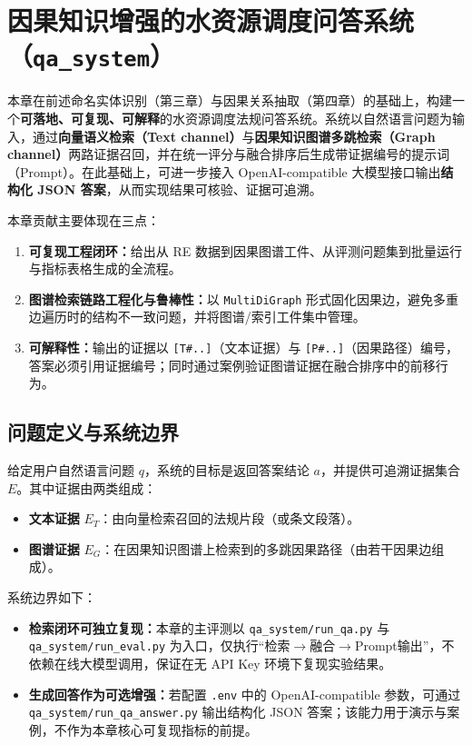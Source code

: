 
\chapter{因果知识增强的水资源调度问答系统（\texttt{qa\_system}）}
\label{chap:qa_system}

本章在前述命名实体识别（第三章）与因果关系抽取（第四章）的基础上，构建一个\textbf{可落地、可复现、可解释}的水资源调度法规问答系统。系统以自然语言问题为输入，通过\textbf{向量语义检索（Text channel）}与\textbf{因果知识图谱多跳检索（Graph channel）}两路证据召回，并在统一评分与融合排序后生成带证据编号的提示词（Prompt）。在此基础上，可进一步接入 OpenAI-compatible 大模型接口输出\textbf{结构化 JSON 答案}，从而实现结果可核验、证据可追溯。

本章贡献主要体现在三点：
\begin{enumerate}
  \item \textbf{可复现工程闭环：}给出从 RE 数据到因果图谱工件、从评测问题集到批量运行与指标表格生成的全流程。
  \item \textbf{图谱检索链路工程化与鲁棒性：}以 \texttt{MultiDiGraph} 形式固化因果边，避免多重边遍历时的结构不一致问题，并将图谱/索引工件集中管理。
  \item \textbf{可解释性：}输出的证据以 \texttt{[T\#..]}（文本证据）与 \texttt{[P\#..]}（因果路径）编号，答案必须引用证据编号；同时通过案例验证图谱证据在融合排序中的前移行为。
\end{enumerate}

\section{问题定义与系统边界}
\label{sec:qa_problem}

给定用户自然语言问题 $q$，系统的目标是返回答案结论 $a$，并提供可追溯证据集合 $E$。其中证据由两类组成：
\begin{itemize}
  \item \textbf{文本证据} $E_T$：由向量检索召回的法规片段（或条文段落）。
  \item \textbf{图谱证据} $E_G$：在因果知识图谱上检索到的多跳因果路径（由若干因果边组成）。
\end{itemize}

系统边界如下：
\begin{itemize}
  \item \textbf{检索闭环可独立复现：}本章的主评测以 \texttt{qa\_system/run\_qa.py} 与 \texttt{qa\_system/run\_eval.py} 为入口，仅执行“检索$\rightarrow$融合$\rightarrow$Prompt输出”，不依赖在线大模型调用，保证在无 API Key 环境下复现实验结果。
  \item \textbf{生成回答作为可选增强：}若配置 \texttt{.env} 中的 OpenAI-compatible 参数，可通过 \texttt{qa\_system/run\_qa\_answer.py} 输出结构化 JSON 答案；该能力用于演示与案例，不作为本章核心可复现指标的前提。
\end{itemize}

